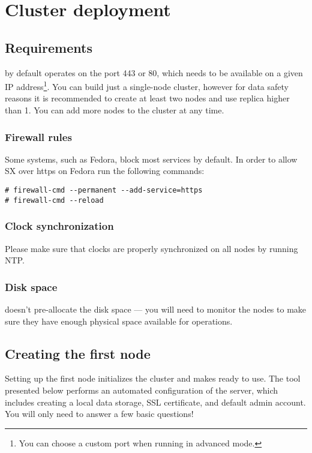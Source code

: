 \chapter{Cluster deployment}

\section{Requirements}

\SX by default operates on the port 443 or 80, which needs to be available on
a given IP address\footnote{You can choose a custom port when running 
in advanced mode.}. You can build just a single-node \SX cluster, however for data
safety reasons it is recommended to create at least two nodes and use replica higher
than 1. You can add more nodes to the cluster at any time.

\subsection{Firewall rules}
Some systems, such as Fedora, block most services by default. In order to allow
SX over https on Fedora run the following commands:
\begin{lstlisting}
# firewall-cmd --permanent --add-service=https
# firewall-cmd --reload
\end{lstlisting}

\subsection{Clock synchronization}
Please make sure that clocks are properly synchronized on all nodes by running
NTP.

\subsection{Disk space}
\SX doesn't pre-allocate the disk space --- you will need to monitor the nodes
to make sure they have enough physical space available for \SX operations.

\section{Creating the first node}

Setting up the first node initializes the cluster and makes \SX ready to
use. The  tool presented below performs an automated
configuration of the \SX server, which includes creating a local
data storage, SSL certificate, and default admin account. You will only
need to answer a few basic questions!

